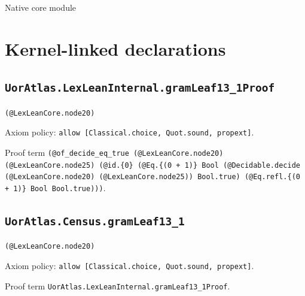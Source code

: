 \documentclass[11pt]{article}
\begin{document}
\begin{center}{\LARGE Native core module}\end{center}
\section*{Kernel-linked declarations}
\subsection*{\texttt{UorAtlas.LexLeanInternal.gramLeaf13\_1Proof}}
\noindent\texttt{(@LexLeanCore.node20)}\par
\noindent Axiom policy: \texttt{allow [Classical.choice, Quot.sound, propext]}.\par
\noindent Proof term \texttt{(@of\_decide\_eq\_true (@LexLeanCore.node20) (@LexLeanCore.node25) (@id.\{0\} (@Eq.\{(0 + 1)\} Bool (@Decidable.decide (@LexLeanCore.node20) (@LexLeanCore.node25)) Bool.true) (@Eq.refl.\{(0 + 1)\} Bool Bool.true)))}.\par
\subsection*{\texttt{UorAtlas.Census.gramLeaf13\_1}}
\noindent\texttt{(@LexLeanCore.node20)}\par
\noindent Axiom policy: \texttt{allow [Classical.choice, Quot.sound, propext]}.\par
\noindent Proof term \texttt{UorAtlas.LexLeanInternal.gramLeaf13\_1Proof}.\par
\end{document}
